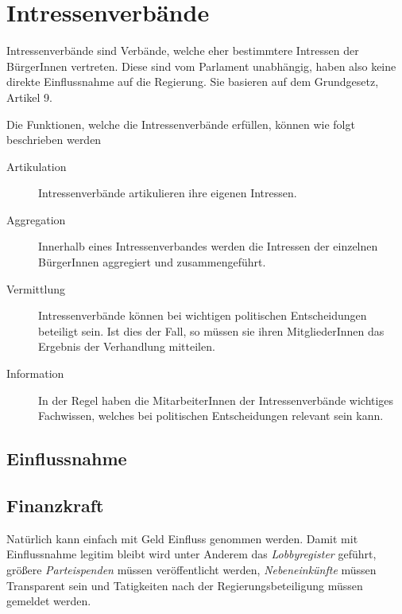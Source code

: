 \documentclass{article}
\begin{document}
\section{Intressenverbände}
Intressenverbände sind Verbände, welche eher bestimmtere Intressen der BürgerInnen vertreten. Diese sind vom Parlament unabhängig, haben also keine direkte Einflussnahme auf die Regierung. Sie basieren auf dem Grundgesetz, Artikel 9.
 
Die Funktionen, welche die Intressenverbände erfüllen, können wie folgt beschrieben werden 
\begin{description}
 \item[Artikulation] Intressenverbände artikulieren ihre eigenen Intressen.
 \item[Aggregation] Innerhalb eines Intressenverbandes werden die Intressen der einzelnen BürgerInnen aggregiert und zusammengeführt.
 \item[Vermittlung] Intressenverbände können bei wichtigen politischen Entscheidungen beteiligt sein. Ist dies der Fall, so müssen sie ihren MitgliederInnen das Ergebnis der Verhandlung mitteilen. 
 \item[Information] In der Regel haben die MitarbeiterInnen der Intressenverbände wichtiges Fachwissen, welches bei politischen Entscheidungen relevant sein kann.
\end{description}
 
\subsection{Einflussnahme} 
 
\subsection{Finanzkraft} 
Natürlich kann einfach mit Geld Einfluss genommen werden. Damit mit Einflussnahme legitim bleibt wird unter Anderem das \emph{Lobbyregister} geführt, größere \emph{Parteispenden} müssen veröffentlicht werden, \emph{Nebeneinkünfte} müssen Transparent sein und Tatigkeiten nach der Regierungsbeteiligung müssen gemeldet werden.   
\end{document}
